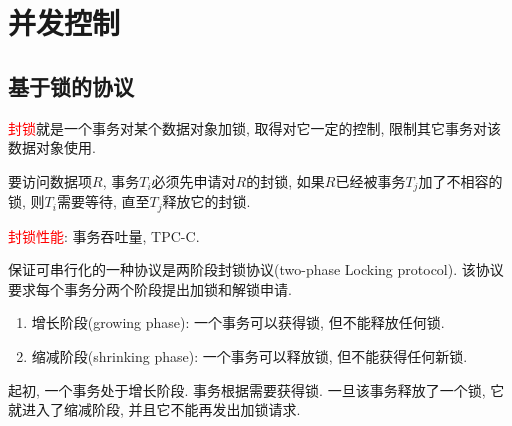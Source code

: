 \chapter{并发控制}

\section{基于锁的协议}

\begin{definition}[封锁]
  \textcolor{red}{封锁}就是一个事务对某个数据对象加锁, 取得对它一定的控制, 限制其它事务对该数据对象使用.
  
  要访问数据项$R$, 事务$T_i$必须先申请对$R$的封锁, 如果$R$已经被事务$T_j$加了不相容的锁, 则$T_i$需要等待, 直至$T_j$释放它的封锁.
\end{definition}

\textcolor{red}{封锁性能}: 事务吞吐量, TPC-C.

保证可串行化的一种协议是两阶段封锁协议(two-phase Locking protocol). 该协议要求每个事务分两个阶段提出加锁和解锁申请.
\begin{enumerate}
    \item 增长阶段(growing phase): 一个事务可以获得锁, 但不能释放任何锁.
    \item 缩减阶段(shrinking phase): 一个事务可以释放锁, 但不能获得任何新锁.
\end{enumerate}
起初, 一个事务处于增长阶段. 事务根据需要获得锁. 一旦该事务释放了一个锁, 它就进入了缩减阶段, 并且它不能再发出加锁请求.

